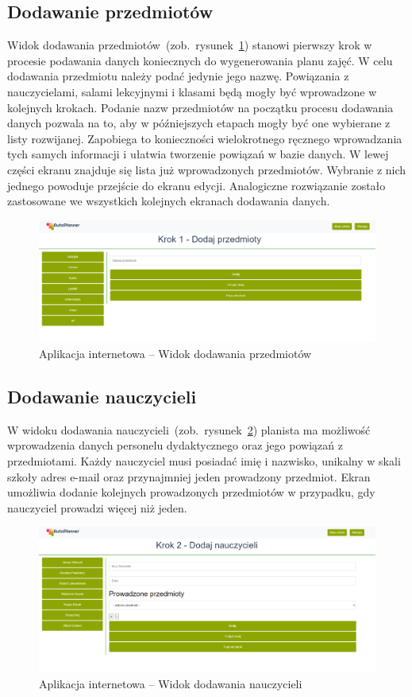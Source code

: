 \subsection{Dodawanie przedmiotów}
Widok dodawania przedmiotów~(zob.~rysunek~\ref{rys:subject}) stanowi pierwszy krok w procesie podawania danych koniecznych do wygenerowania planu zajęć. W celu dodawania przedmiotu należy podać jedynie jego nazwę. Powiązania z nauczycielami, salami lekcyjnymi i klasami będą mogły być wprowadzone w kolejnych krokach. Podanie nazw przedmiotów na początku procesu dodawania danych pozwala na to, aby w późniejszych etapach mogły być one wybierane z listy rozwijanej. Zapobiega to konieczności wielokrotnego ręcznego wprowadzania tych samych informacji i ułatwia tworzenie powiązań w bazie danych. W lewej części ekranu znajduje się lista już wprowadzonych przedmiotów. Wybranie z nich jednego powoduje przejście do ekranu edycji. Analogiczne rozwiązanie zostało zastosowane we wszystkich kolejnych ekranach dodawania danych.
\begin{figure}[!ht]
\centering\includegraphics[width=\textwidth]{figures/subject}
\caption{Aplikacja internetowa -- Widok dodawania przedmiotów}\label{rys:subject}
\end{figure}
\subsection{Dodawanie nauczycieli}
W widoku dodawania nauczycieli~(zob.~rysunek~\ref{rys:teacher}) planista ma możliwość wprowadzenia danych personelu dydaktycznego oraz jego powiązań z przedmiotami. Każdy nauczyciel musi posiadać imię i nazwisko, unikalny w skali szkoły adres e-mail oraz przynajmniej jeden prowadzony przedmiot. Ekran umożliwia dodanie kolejnych prowadzonych przedmiotów w przypadku, gdy nauczyciel prowadzi więcej niż jeden. 
\begin{figure}[!ht]
\centering\includegraphics[width=\textwidth]{figures/teacher}
\caption{Aplikacja internetowa -- Widok dodawania nauczycieli}\label{rys:teacher}
\end{figure}
